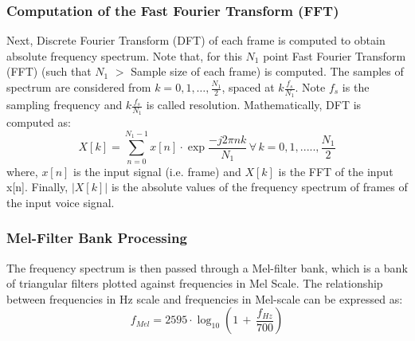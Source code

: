 \documentclass{article}
\begin{document}
{\subsubsection{{Computation of the Fast Fourier Transform (FFT)}} Next, Discrete Fourier Transform (DFT) of each frame is computed to obtain absolute frequency spectrum. Note that, for this $N_1$ point Fast Fourier Transform (FFT) (such that $N_1$ $>$ Sample size of each frame) is computed. The samples of spectrum are considered from $k = 0,1,\dots,$$\frac{N_1}{2}$, spaced at $k\frac{f_s}{N_1}$. Note $f_s$ is the sampling frequency and $k\frac{f_s}{N_1}$ is called resolution. Mathematically, DFT is computed as:
\begin{equation}
{X[k]} = \sum\limits_{n=0}^{N_1-1}{x[n]\cdot \exp{\frac{-j2\pi nk}{N_1}}}\,\forall\, {k}=0,1,.....,{\frac{N_1}{2}}
\end{equation}
where, ${x[n]}$ is the input signal (i.e. frame) and ${X[k]}$ is the FFT of the input x[n]. Finally, ${|X[k]|}$ is the absolute values of the frequency spectrum of frames of the input voice signal.
\subsubsection{{Mel-Filter Bank Processing}} The frequency spectrum is then passed through a Mel-filter bank, which is a bank of triangular filters plotted against frequencies in Mel Scale. The relationship between frequencies in Hz scale and frequencies in Mel-scale can be expressed as:
\begin{equation}
{f}_{Mel} = 2595\cdot\log_{10}{\left(1\,+\,\frac{{f}_{Hz}}{700}\right)}
\end{equation} 

}
\end{document}
